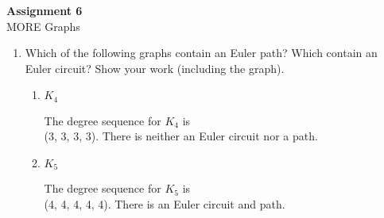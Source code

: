 \documentclass[11pt, letterpaper, includehead]{article}
\theoremstyle{plain}
\theoremstyle{mydefinition}
\theoremstyle{myproperty}
\begin{document}
\pagestyle{fancy}
\fancyhead{}
\fancyfoot{}

\begin{center}
    \Large{\textbf{Assignment 6}}\\
    \Large{MORE Graphs}
\end{center}

\begin{enumerate}[label=\textbf{\arabic*}., leftmargin=*]
    \item Which of the following graphs contain an Euler path? Which contain an Euler circuit? Show your work (including the graph).
    
    \begin{center}
        \begin{minipage}[t]{0.48\textwidth}
        \begin{enumerate}[label=(\alph*)]
            \item $K_4$
            
            The degree sequence for $K_4$ is \\(3, 3, 3, 3). There is neither an Euler circuit nor a path.
            
            \begin{center}
            \end{center}
            
            \item $K_5$
            
            The degree sequence for $K_5$ is \\(4, 4, 4, 4, 4). There is an Euler circuit and path.
            
            \begin{center}
            \end{center}
            

\end{enumerate}
\end{minipage}
\end{center}
\end{enumerate}
\end{document}
